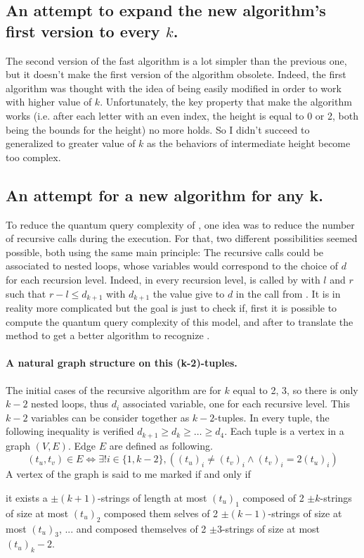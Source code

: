\subsection{An attempt to expand the new
    algorithm's first version to every $k$.}

The second version of the fast algorithm is a lot simpler than the
previous one, but it doesn't make the first version of the algorithm
obsolete. Indeed, the first algorithm was thought with the idea of being
easily modified in order to work with higher value of $k$. Unfortunately,
the key property that make the algorithm works (i.e. after each letter with
an even index, the height is equal to 0 or 2, both being the bounds for the
height) no more holds. So I didn't succeed to generalized to greater value
of $k$ as the behaviors of intermediate height become too complex.

\subsection{An attempt for a new algorithm for any k.}
\label{subsec:dicho}

To reduce the quantum query complexity of , one idea was
to reduce the number of recursive calls during the execution. For that,
two different possibilities seemed possible, both using the same
main principle: The recursive calls could be associated to nested loops,
whose variables would correspond to the choice of $d$ for each recursion level.
Indeed, in every recursion level,  is called by  with $l$ and $r$
such that $r-l\leq d_{k+1}$ with $d_{k+1}$ the value give to $d$ in the call
from . It is in reality more complicated but the goal is just to
check if, first it is possible to compute the quantum query complexity
of this model, and after to translate the method to get a better algorithm to
recognize .

\paragraph*{A natural graph structure on this (k-2)-tuples.} The initial
cases of the recursive algorithm  are for $k$ equal to 2, 3, so there
is only $k-2$ nested loops, thus $d_i$
associated variable, one for each recursive level. This $k-2$ variables can
be consider together as $k-2$-tuples. In every tuple, the following inequality
is verified $ d_{k+1} \geq d_k \geq \ldots \geq d_4$. Each tuple is a vertex
in a graph $(V,E)$. Edge $E$ are defined as following.
\[ (t_u,t_v) \in E \Leftrightarrow \exists ! i \in \{1, k-2\}, \left( (t_u)_i
    \neq (t_v)_i \land (t_v)_i = 2(t_u)_i\right)\]
A vertex of the graph is said to me marked if and only if
\begin{center}
    \begin{minipage}{.8\textwidth}
        it exists a $\pm (k+1)$-strings
        of length at most $(t_u)_1$ composed of 2 $\pm k$-strings of size at most
        $(t_u)_2$ composed them selves of 2 $\pm (k-1)$-strings of size at most
        $(t_u)_3$, ... and composed themselves of  2 $\pm 3$-strings of size at most
        $(t_u)_k-2$.
    \end{minipage}
\end{center}

